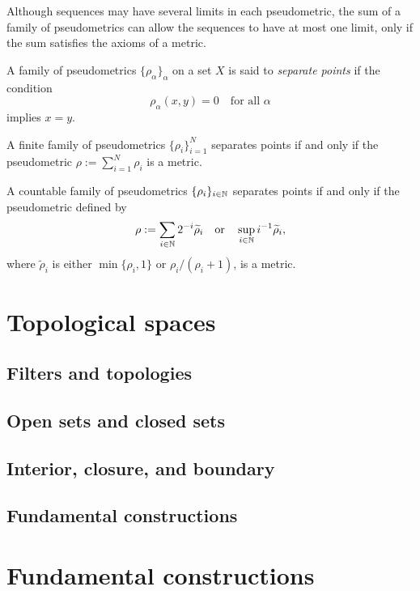 \documentclass{../note}
\begin{document}
Although sequences may have several limits in each pseudometric, the sum of a family of pseudometrics can allow the sequences to have at most one limit, only if the sum satisfies the axioms of a metric.

\begin{defn}
A family of pseudometrics $\{\rho_\alpha\}_\alpha$ on a set $X$ is said to \emph{separate points} if the condition 
\[\rho_\alpha(x,y)=0\quad\text{for all $\alpha$}\]
implies $x=y$.
\end{defn}
\begin{prop}
\begin{parts}
\item
A finite family of pseudometrics $\{\rho_i\}_{i=1}^N$ separates points if and only if the pseudometric $\rho:=\sum_{i=1}^N\rho_i$ is a metric.
\item
A countable family of pseudometrics $\{\rho_i\}_{i\in\mathbb{N}}$ separates points if and only if the pseudometric defined by
\[\rho:=\sum_{i\in\mathbb{N}}2^{-i}\widetilde\rho_i\quad\text{or}\quad\sup_{i\in\mathbb{N}}i^{-1}\widetilde\rho_i,\]
where $\tilde\rho_i$ is either $\min\{\rho_i,1\}$ or $\rho_i/(\rho_i+1)$, is a metric.
\end{parts}
\end{prop}




\chapter{Topological spaces}

\section{Filters and topologies}

\section{Open sets and closed sets}

\section{Interior, closure, and boundary}

\section{Fundamental constructions}


\chapter{Fundamental constructions}
\end{document}
